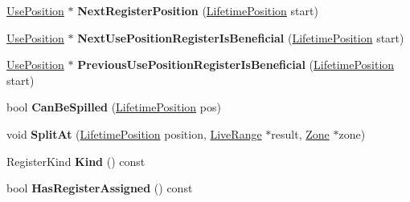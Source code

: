 \begin{DoxyCompactItemize}
\item 
\hypertarget{classv8_1_1internal_1_1_live_range_a7b60252c67b95b3091aacb9495126122}{}\hyperlink{classv8_1_1internal_1_1_use_position}{Use\+Position} $\ast$ {\bfseries Next\+Register\+Position} (\hyperlink{classv8_1_1internal_1_1_lifetime_position}{Lifetime\+Position} start)\label{classv8_1_1internal_1_1_live_range_a7b60252c67b95b3091aacb9495126122}

\item 
\hypertarget{classv8_1_1internal_1_1_live_range_a0565e8c06effb699fc295da60310cb68}{}\hyperlink{classv8_1_1internal_1_1_use_position}{Use\+Position} $\ast$ {\bfseries Next\+Use\+Position\+Register\+Is\+Beneficial} (\hyperlink{classv8_1_1internal_1_1_lifetime_position}{Lifetime\+Position} start)\label{classv8_1_1internal_1_1_live_range_a0565e8c06effb699fc295da60310cb68}

\item 
\hypertarget{classv8_1_1internal_1_1_live_range_a6b69d6bc73849c7634f1949ef22d065d}{}\hyperlink{classv8_1_1internal_1_1_use_position}{Use\+Position} $\ast$ {\bfseries Previous\+Use\+Position\+Register\+Is\+Beneficial} (\hyperlink{classv8_1_1internal_1_1_lifetime_position}{Lifetime\+Position} start)\label{classv8_1_1internal_1_1_live_range_a6b69d6bc73849c7634f1949ef22d065d}

\item 
\hypertarget{classv8_1_1internal_1_1_live_range_af065b9f68029ad43cf11fd29573dd32e}{}bool {\bfseries Can\+Be\+Spilled} (\hyperlink{classv8_1_1internal_1_1_lifetime_position}{Lifetime\+Position} pos)\label{classv8_1_1internal_1_1_live_range_af065b9f68029ad43cf11fd29573dd32e}

\item 
\hypertarget{classv8_1_1internal_1_1_live_range_af6b33331f5944c9d42f58f4dd218256f}{}void {\bfseries Split\+At} (\hyperlink{classv8_1_1internal_1_1_lifetime_position}{Lifetime\+Position} position, \hyperlink{classv8_1_1internal_1_1_live_range}{Live\+Range} $\ast$result, \hyperlink{classv8_1_1internal_1_1_zone}{Zone} $\ast$zone)\label{classv8_1_1internal_1_1_live_range_af6b33331f5944c9d42f58f4dd218256f}

\item 
\hypertarget{classv8_1_1internal_1_1_live_range_a8f1a924f788aea83da136eee806438fb}{}Register\+Kind {\bfseries Kind} () const \label{classv8_1_1internal_1_1_live_range_a8f1a924f788aea83da136eee806438fb}

\item 
\hypertarget{classv8_1_1internal_1_1_live_range_a186788ab3b77e3eee40e1092a27ae6fe}{}bool {\bfseries Has\+Register\+Assigned} () const \label{classv8_1_1internal_1_1_live_range_a186788ab3b77e3eee40e1092a27ae6fe}


\end{DoxyCompactItemize}
